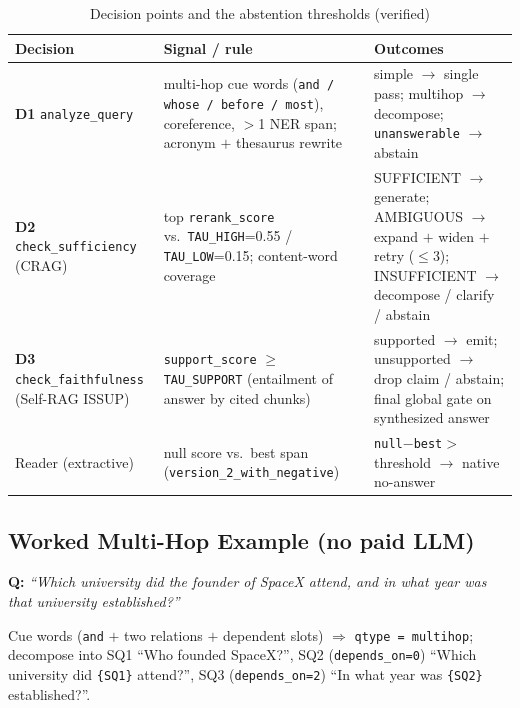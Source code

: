 \documentclass[12pt,a4paper]{article}
\begin{document}
\begin{table}[H]
\centering
\caption{Decision points and the abstention thresholds (verified)}
\small
\begin{tabularx}{\linewidth}{@{} l L L @{}}
\toprule
\textbf{Decision} & \textbf{Signal / rule} & \textbf{Outcomes} \\
\midrule
\textbf{D1} \texttt{analyze\_query} & multi-hop cue words (\texttt{and / whose / before / most}), coreference, $>$1 NER span; acronym $+$ thesaurus rewrite & simple $\rightarrow$ single pass; multihop $\rightarrow$ decompose; \texttt{unanswerable} $\rightarrow$ abstain \\
\textbf{D2} \texttt{check\_sufficiency} (CRAG) & top \texttt{rerank\_score} vs.\ \texttt{TAU\_HIGH}=0.55 / \texttt{TAU\_LOW}=0.15; content-word coverage & SUFFICIENT $\rightarrow$ generate; AMBIGUOUS $\rightarrow$ expand $+$ widen $+$ retry ($\leq$3); INSUFFICIENT $\rightarrow$ decompose / clarify / abstain \\
\textbf{D3} \texttt{check\_faithfulness} (Self-RAG ISSUP) & \texttt{support\_score} $\geq$ \texttt{TAU\_SUPPORT} (entailment of answer by cited chunks) & supported $\rightarrow$ emit; unsupported $\rightarrow$ drop claim / abstain; final global gate on synthesized answer \\
Reader (extractive) & null score vs.\ best span (\texttt{version\_2\_with\_negative}) & \texttt{null}$-$\texttt{best}$>$threshold $\rightarrow$ native no-answer \\
\bottomrule
\end{tabularx}
\end{table}

\subsection{Worked Multi-Hop Example (no paid LLM)}

\noindent\textbf{Q:} \textit{``Which university did the founder of SpaceX attend, and in what year was that university established?''}

\noindent Cue words (\texttt{and} $+$ two relations $+$ dependent slots) $\Rightarrow$ \texttt{qtype = multihop}; decompose into SQ1 ``Who founded SpaceX?'', SQ2 (\texttt{depends\_on=0}) ``Which university did \texttt{\{SQ1\}} attend?'', SQ3 (\texttt{depends\_on=2}) ``In what year was \texttt{\{SQ2\}} established?''.
\end{document}
